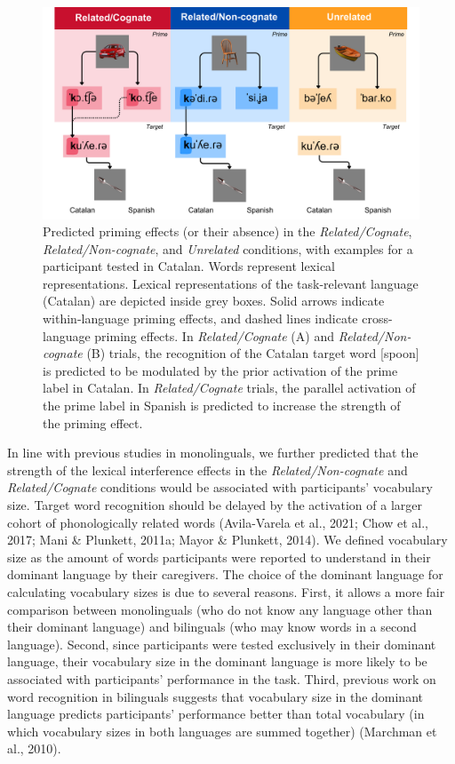 \documentclass[
  12pt,
  b5paperpaper,
  twoside]{scrreprt}
\begin{document}
\begin{figure}

{\centering \includegraphics{chapters/../_assets/img/hypotheses.png}

}

\caption{\label{fig-hypotheses}Predicted priming effects (or their
absence) in the \emph{Related/Cognate}, \emph{Related/Non-cognate}, and
\emph{Unrelated} conditions, with examples for a participant tested in
Catalan. Words represent lexical representations. Lexical
representations of the task-relevant language (Catalan) are depicted
inside grey boxes. Solid arrows indicate within-language priming
effects, and dashed lines indicate cross-language priming effects. In
\emph{Related/Cognate} (A) and \emph{Related/Non-cognate} (B) trials,
the recognition of the Catalan target word 
{[}spoon{]} is predicted to be modulated by the prior activation of the
prime label in Catalan. In \emph{Related/Cognate} trials, the parallel
activation of the prime label in Spanish is predicted to increase the
strength of the priming effect.}

\end{figure}

In line with previous studies in monolinguals, we further predicted that
the strength of the lexical interference effects in the
\emph{Related/Non-cognate} and \emph{Related/Cognate} conditions would
be associated with participants' vocabulary size. Target word
recognition should be delayed by the activation of a larger cohort of
phonologically related words (Avila-Varela et al., 2021; Chow et al.,
2017; Mani \& Plunkett, 2011a; Mayor \& Plunkett, 2014). We defined
vocabulary size as the amount of words participants were reported to
understand in their dominant language by their caregivers. The choice of
the dominant language for calculating vocabulary sizes is due to several
reasons. First, it allows a more fair comparison between monolinguals
(who do not know any language other than their dominant language) and
bilinguals (who may know words in a second language). Second, since
participants were tested exclusively in their dominant language, their
vocabulary size in the dominant language is more likely to be associated
with participants' performance in the task. Third, previous work on word
recognition in bilinguals suggests that vocabulary size in the dominant
language predicts participants' performance better than total vocabulary
(in which vocabulary sizes in both languages are summed together)
(Marchman et al., 2010).
\end{document}
